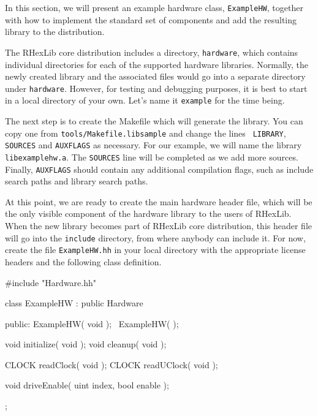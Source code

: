 In this section, we will present an example hardware class, {\tt ExampleHW},
together with how to implement the standard set of components and add the
resulting library to the distribution.

The RHexLib core distribution includes a directory, {\tt hardware}, which
contains individual directories for each of the supported hardware
libraries. Normally, the newly created library and the associated files
would go into a separate directory under {\tt hardware}. However, for
testing and debugging purposes, it is best to start in a local directory of
your own. Let's name it {\tt example} for the time being.\\


The next step is to create the Makefile which will generate the library. You
can copy one from {\tt tools/Makefile.libsample} and change the lines {\tt
  LIBRARY}, {\tt SOURCES} and {\tt AUXFLAGS} as necessary. For our example,
we will name the library {\tt libexamplehw.a}. The {\tt SOURCES} line will
be completed as we add more sources. Finally, {\tt AUXFLAGS} should contain
any additional compilation flags, such as include search paths and library
search paths.

At this point, we are ready to create the main hardware header file, which
will be the only visible component of the hardware library to the users of
RHexLib. When the new library becomes part of RHexLib core distribution,
this header file will go into the {\tt include} directory, from where
anybody can include it. For now, create the file {\tt ExampleHW.hh} in your
local directory with the appropriate license headers and the following class
definition.

\begin{classdef}
#include "Hardware.hh"

class ExampleHW : public Hardware {

public:
  ExampleHW( void );
  ~ExampleHW( );

  void initialize( void );
  void cleanup( void );

  CLOCK readClock( void );
  CLOCK readUClock( void );

  void driveEnable( uint index, bool enable );
};
\end{classdef}

